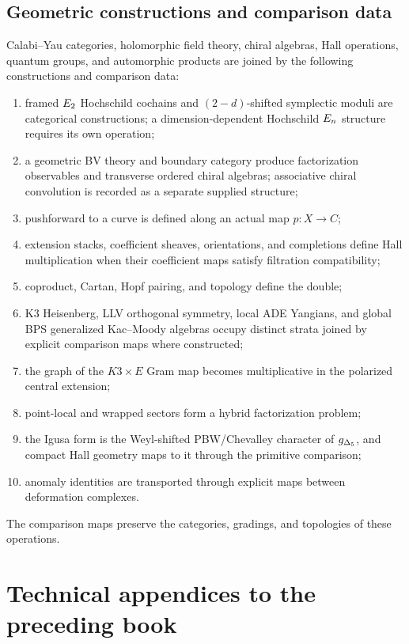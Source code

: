 \chapter{Geometric constructions and comparison data}
Calabi--Yau categories, holomorphic field theory, chiral algebras, Hall operations, quantum groups, and automorphic products are joined by the following constructions and comparison data:
\begin{enumerate}
\item framed $E_2$ Hochschild cochains and $(2-d)$-shifted symplectic moduli are categorical constructions; a dimension-dependent Hochschild $E_n$ structure requires its own operation;
\item a geometric BV theory and boundary category produce factorization observables and transverse ordered chiral algebras; associative chiral convolution is recorded as a separate supplied structure;
\item pushforward to a curve is defined along an actual map $p:X\to C$;
\item extension stacks, coefficient sheaves, orientations, and completions define Hall multiplication when their coefficient maps satisfy filtration compatibility;
\item coproduct, Cartan, Hopf pairing, and topology define the double;
\item K3 Heisenberg, LLV orthogonal symmetry, local ADE Yangians, and global BPS generalized Kac--Moody algebras occupy distinct strata joined by explicit comparison maps where constructed;
\item the graph of the $K3\times E$ Gram map becomes multiplicative in the polarized central extension;
\item point-local and wrapped sectors form a hybrid factorization problem;
\item the Igusa form is the Weyl-shifted PBW/Chevalley character of ${g_{\Delta_5}}$, and compact Hall geometry maps to it through the primitive comparison;
\item anomaly identities are transported through explicit maps between deformation complexes.
\end{enumerate}
The comparison maps preserve the categories, gradings, and topologies of these operations.

\part{Technical appendices to the preceding book}
